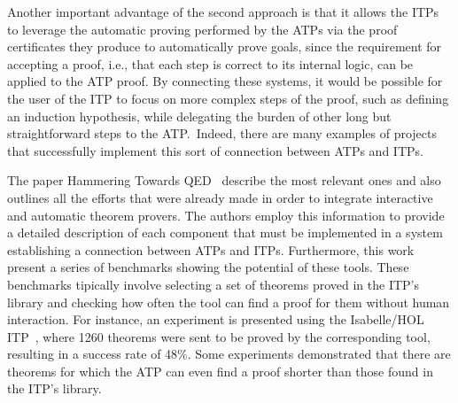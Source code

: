 Another important advantage of the second approach is that it allows the ITPs to leverage the automatic proving performed by the ATPs via the proof certificates they produce to automatically prove goals, since the requirement for accepting a proof, i.e., that each step is correct to its internal logic, can be applied to the ATP proof.
%
By connecting these systems, it would be possible for the user of the ITP to focus on more complex steps of the proof, such as defining an induction hypothesis, while delegating the burden of other long but straightforward steps to the ATP.\
Indeed, there are many examples of projects that successfully
implement this sort of connection between ATPs and ITPs.

The paper Hammering Towards QED~\cite{hammering} describe
the most relevant ones and also outlines
all the efforts that were already made in order to integrate
interactive and automatic theorem provers. The authors employ
this information to provide a detailed description of each
component that must be implemented in a system establishing
a connection between ATPs and ITPs. Furthermore, this work
present a series of benchmarks showing the potential of these
tools. These benchmarks tipically involve selecting a set
of theorems proved in the ITP's library and checking how often the
tool can find a proof for them without human interaction.
For instance, an experiment is presented using the Isabelle/HOL ITP~\cite{Nipkow2002}, where
1260 theorems were sent to be proved by the corresponding tool,
resulting in a success rate of 48\%.
Some experiments demonstrated that there are theorems for which
the ATP can even find a proof shorter than those found in the ITP's library.
